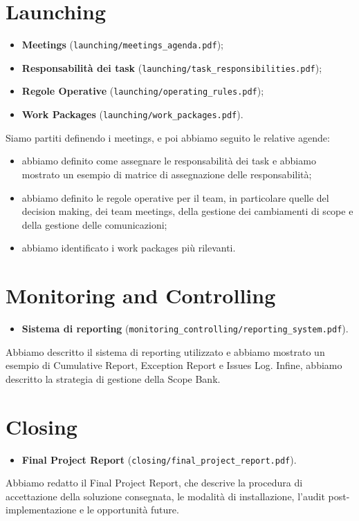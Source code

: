 \documentclass[a4paper,12pt]{article}
\begin{document}
\section{Launching}
\begin{itemize}
    \item \textbf{Meetings} (\texttt{launching/meetings\_agenda.pdf});
    \item \textbf{Responsabilità dei task} (\texttt{launching/task\_responsibilities.pdf});
    \item \textbf{Regole Operative} (\texttt{launching/operating\_rules.pdf});
    \item \textbf{Work Packages} (\texttt{launching/work\_packages.pdf}).
\end{itemize}
Siamo partiti definendo i meetings, e poi abbiamo seguito le relative agende:
\begin{itemize}
    \item abbiamo definito come assegnare le responsabilità dei task e abbiamo mostrato un esempio di matrice di
    assegnazione delle responsabilità;
    \item abbiamo definito le regole operative per il team, in particolare quelle del decision making, dei team
    meetings, della gestione dei cambiamenti di scope e della gestione delle comunicazioni;
    \item abbiamo identificato i work packages più rilevanti.
\end{itemize}

\section{Monitoring and Controlling}
\begin{itemize}
    \item \textbf{Sistema di reporting} (\texttt{monitoring\_controlling/reporting\_system.pdf}).
\end{itemize}
Abbiamo descritto il sistema di reporting utilizzato e abbiamo mostrato un esempio di Cumulative Report, Exception
Report e Issues Log. Infine, abbiamo descritto la strategia di gestione della Scope Bank.

\section{Closing}
\begin{itemize}
    \item \textbf{Final Project Report} (\texttt{closing/final\_project\_report.pdf}).
\end{itemize}
Abbiamo redatto il Final Project Report, che descrive la procedura di accettazione della soluzione consegnata, le
modalità di installazione, l'audit post-implementazione e le opportunità future.
\end{document}
